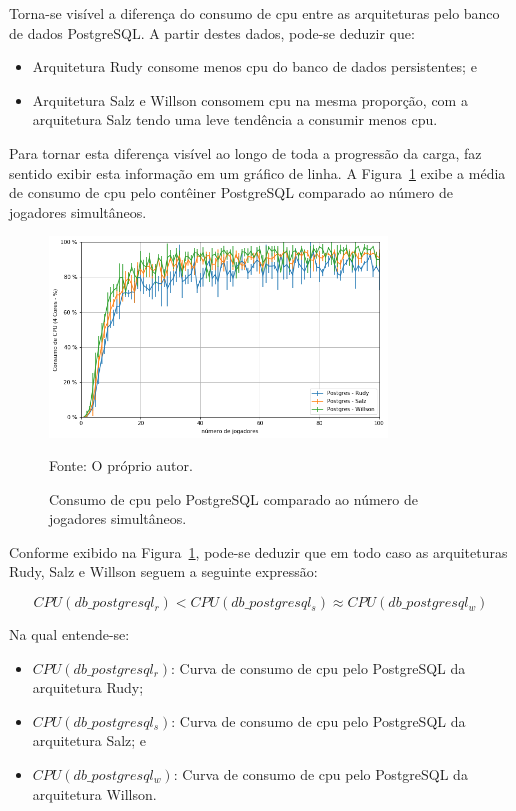 Torna-se visível a diferença do consumo de \ac{cpu} entre as arquiteturas pelo banco de dados PostgreSQL.
%
A partir destes dados, pode-se deduzir que:

\begin{itemize}
 \item Arquitetura Rudy consome menos \ac{cpu} do banco de dados persistentes; e 
 \item Arquitetura Salz e Willson consomem \ac{cpu} na mesma proporção, com a arquitetura Salz tendo uma leve tendência a consumir menos \ac{cpu}.
\end{itemize}

Para tornar esta diferença visível ao longo de toda a progressão da carga, faz sentido exibir esta informação em um gráfico de linha.
%
A Figura~\ref{fig:cpu_db_media_por_jogador} exibe a média de consumo de \ac{cpu} pelo contêiner PostgreSQL comparado ao número de jogadores simultâneos.

\begin{figure}[htb!]
  \caption{Consumo de \ac{cpu} pelo PostgreSQL comparado ao número de jogadores simultâneos.}
  \label{fig:cpu_db_media_por_jogador}
  \includegraphics[width=0.8\textwidth]{figuras/analise/cpu_db_media_por_jogador.png}
  \centering

  Fonte: O próprio autor.
\end{figure}

Conforme exibido na Figura~\ref{fig:cpu_db_media_por_jogador}, pode-se deduzir que em todo caso as arquiteturas Rudy, Salz e Willson seguem a seguinte expressão:

$$
    CPU(db\_postgresql_{r}) < CPU(db\_postgresql_{s}) \approx CPU(db\_postgresql_{w})
$$

Na qual entende-se:

\begin{itemize}
\item $CPU(db\_postgresql_{r})$: Curva de consumo de \ac{cpu} pelo PostgreSQL da arquitetura Rudy;
\item $CPU(db\_postgresql_{s})$: Curva de consumo de \ac{cpu} pelo PostgreSQL da arquitetura Salz; e
\item $CPU(db\_postgresql_{w})$: Curva de consumo de \ac{cpu} pelo PostgreSQL da arquitetura Willson.
\end{itemize}


